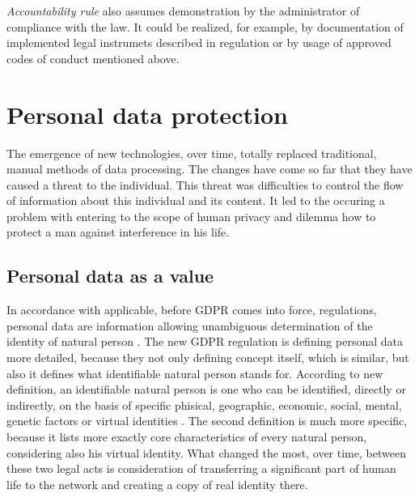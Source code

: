 \documentclass[en, noamssymb]{mgr}
\begin{document}
\indent \textit{Accountability rule} also assumes demonstration by the administrator of compliance with the law. It could be realized, for example, by documentation of implemented legal instrumets described in regulation or by usage of approved codes of conduct mentioned above.


\chapter{Personal data protection} \label{sec:sekcjaDaneOsobowe}

The emergence of new technologies, over time, totally replaced traditional, manual methods of data processing. The changes have come so far that they have caused a threat to the individual. This threat was difficulties to control the flow of information about this individual and its content. It led to the occuring a problem with entering to the scope of human privacy and dilemma how to protect a man against interference in his life.



\section{Personal data as a value}

In accordance with applicable, before GDPR comes into force, regulations, personal data are information allowing unambiguous determination of the identity of natural person \cite{uodo_art6}. The new GDPR regulation is defining personal data more detailed, because they not only defining concept itself, which is similar, but also it defines what identifiable natural person stands for. According to new definition, an identifiable natural person is one who can be identified, directly or indirectly, on the basis of specific phisical, geographic, economic, social, mental, genetic factors or virtual identities \cite{rodo_art4}. The second definition is much more specific, because it lists more exactly core characteristics of every natural person, considering also his virtual identity. What changed the most, over time, between these two legal acts is consideration of transferring a significant part of human life to the network and creating a copy of real identity there.
\end{document}
